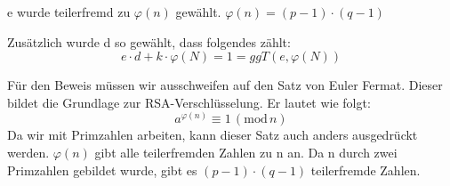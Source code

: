 e wurde teilerfremd zu $ \varphi(n) $ gewählt. 
$ \varphi(n) = (p-1) \cdot (q-1) $

Zusätzlich wurde d so gewählt, dass folgendes zählt:
\begin{equation*}
 e \cdot d + k \cdot \varphi(N) = 1 = ggT(e,\varphi(N))
\end{equation*}

Für den Beweis müssen wir ausschweifen auf den Satz von Euler Fermat. Dieser bildet die Grundlage zur RSA-Verschlüsselung. Er lautet wie folgt:
\begin{equation*}
	a^{\varphi(n)} \equiv 1\,(\mathrm{mod}\,n)
\end{equation*}
Da wir mit Primzahlen arbeiten, kann dieser Satz auch anders ausgedrückt werden. $ \varphi(n) $ gibt alle teilerfremden Zahlen zu n an. Da n durch zwei Primzahlen gebildet wurde, gibt es $ (p-1) \cdot (q-1) $ teilerfremde Zahlen. 
%

